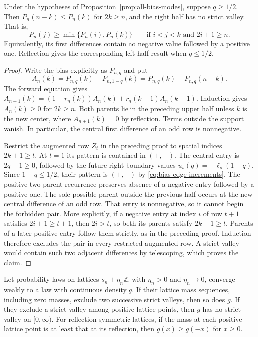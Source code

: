 \begin{proposition}\label{prop:dominant-half}
Under the hypotheses of Proposition~\ref{prop:all-bias-modes}, suppose
$q\ge1/2$. Then $P_n(n-k)\le P_n(k)$ for $2k\ge n$, and the right half has
no strict valley. That is,
\[
 P_n(j)\ge\min\{P_n(i),P_n(k)\}
 \qquad\text{if }i<j<k\text{ and }2i+1\ge n.
\]
Equivalently, its first differences contain no negative value followed
by a positive one. Reflection gives the corresponding left-half result
when $q\le1/2$.
\end{proposition}

\begin{proof}
Write the bias explicitly as $P_{n,q}$ and put
\[
 A_n(k)=P_{n,q}(k)-P_{n,1-q}(k)
       =P_{n,q}(k)-P_{n,q}(n-k).
\]
The forward equation gives
$A_{n+1}(k)=(1-r_n(k))A_n(k)+r_n(k-1)A_n(k-1)$.
Induction gives $A_n(k)\ge0$ for $2k\ge n$. Both parents lie in
the preceding upper half unless $k$ is the new center, where
$A_{n+1}(k)=0$ by reflection. Terms outside the support vanish. In particular, the
central first difference of an odd row is nonnegative.

Restrict the augmented row $Z_t$ in the preceding proof to spatial
indices $2k+1\ge t$. At $t=1$ its pattern is contained in $(+,-)$. The central entry is
$2q-1\ge0$, followed by the future right boundary values
$u_s(q)=-\ell_s(1-q)$. Since
$1-q\le1/2$, their pattern is $(+,-)$ by
\eqref{eq:bias-edge-increments}. The positive two-parent recurrence
preserves absence of a negative entry followed by a positive one.
The sole possible parent outside the previous half occurs at the new
central difference of an odd row. That entry is nonnegative, so it
cannot begin the forbidden pair. More explicitly, if a negative entry
at index $i$ of row $t+1$ satisfies $2i+1\ge t+1$, then $2i>t$, so both its parents satisfy $2k+1\ge t$. Parents of a later positive
entry follow them strictly, as in the preceding proof. Induction
therefore excludes the pair in every restricted augmented row.
A strict valley would contain such two adjacent differences by
telescoping, which proves the claim.
\end{proof}

\begin{lemma}\label{lem:weak-shape-transfer}
Let probability laws on lattices $s_n+\eta_n\mathbb Z$, with
$\eta_n>0$ and $\eta_n\to0$, converge weakly to a law with continuous density $g$.
If their lattice mass sequences, including zero masses, exclude two successive
strict valleys, then so does $g$. If they exclude a strict valley among positive lattice points, then
$g$ has no strict valley on $[0,\infty)$. For reflection-symmetric lattices,
if the mass at each positive lattice point is at least that at its reflection, then
$g(x)\ge g(-x)$ for $x\ge0$.
\end{lemma}

